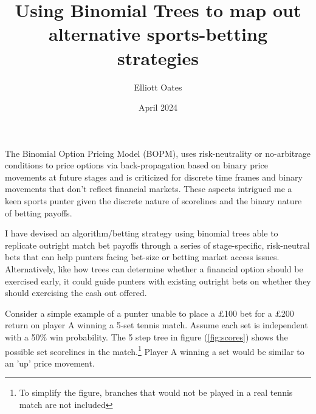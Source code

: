 \documentclass{article}
\title{Using Binomial Trees to map out alternative sports-betting strategies}
\author{Elliott Oates}
\date{April 2024}
\begin{document}

The Binomial Option Pricing Model (BOPM), uses risk-neutrality or no-arbitrage conditions to price options via back-propagation based on binary price movements at future stages and is criticized for discrete time frames and binary movements that don't reflect financial markets. These aspects intrigued me a keen sports punter given the discrete nature of scorelines and the binary nature of betting payoffs.

I have devised an algorithm/betting strategy using binomial trees able to replicate outright match bet payoffs through a series of stage-specific, risk-neutral bets that can help punters facing bet-size or betting market access issues. Alternatively, like how trees can determine whether a financial option should be exercised early, it could guide punters with existing outright bets on whether they should exercising the cash out offered. 

Consider a simple example of a punter unable to place a £100 bet for a £200 return on player A winning a 5-set tennis match. Assume each set is independent with a 50\% win probability. The 5 step tree in figure (\ref{fig:scores}) shows the possible set scorelines in the match.\footnote{To simplify the figure, branches that would not be played in a real tennis match are not included}  Player A winning a set would be similar to an 'up' price movement. 
\end{document}

